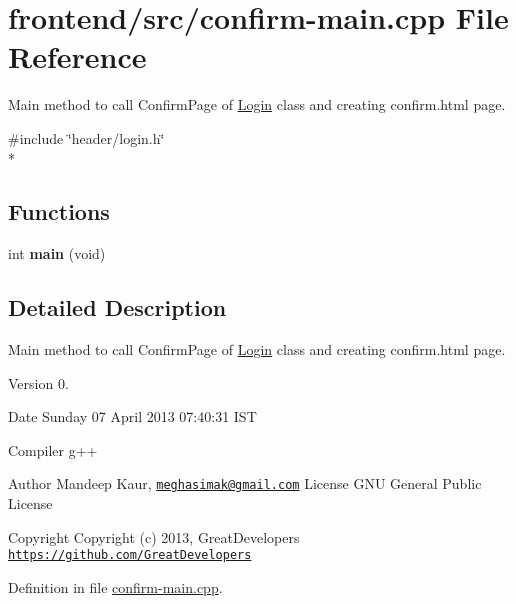 \hypertarget{confirm-main_8cpp}{\section{frontend/src/confirm-\/main.cpp File Reference}
\label{confirm-main_8cpp}
}


Main method to call Confirm\-Page of \hyperlink{classLogin}{Login} class and creating confirm.\-html page.  


{\ttfamily \#include \char`\"{}header/login.\-h\char`\"{}}\\*
\subsection*{Functions}
\begin{DoxyCompactItemize}
\item 
\hypertarget{confirm-main_8cpp_a840291bc02cba5474a4cb46a9b9566fe}{int {\bfseries main} (void)}\label{confirm-main_8cpp_a840291bc02cba5474a4cb46a9b9566fe}

\end{DoxyCompactItemize}


\subsection{Detailed Description}
Main method to call Confirm\-Page of \hyperlink{classLogin}{Login} class and creating confirm.\-html page. \begin{DoxyVersion}{Version}
0. 
\end{DoxyVersion}
\begin{DoxyDate}{Date}
Sunday 07 April 2013 07\-:40\-:31 I\-S\-T\par
Compiler g++
\end{DoxyDate}
\begin{DoxyAuthor}{Author}
Mandeep Kaur, \href{mailto:meghasimak@gmail.com}{\tt meghasimak@gmail.\-com} License G\-N\-U General Public License 
\end{DoxyAuthor}
\begin{DoxyCopyright}{Copyright}
Copyright (c) 2013, Great\-Developers \href{https://github.com/GreatDevelopers}{\tt https\-://github.\-com/\-Great\-Developers} 
\end{DoxyCopyright}


Definition in file \hyperlink{confirm-main_8cpp_source}{confirm-\/main.\-cpp}.


